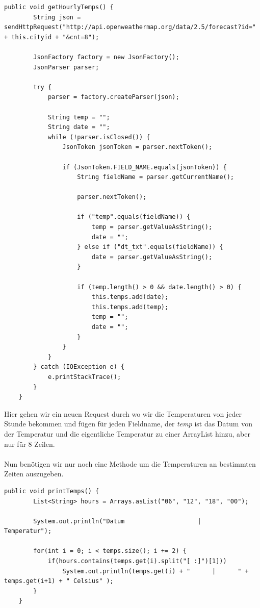 \begin{lstlisting}
public void getHourlyTemps() {
        String json = sendHttpRequest("http://api.openweathermap.org/data/2.5/forecast?id=" + this.cityid + "&cnt=8");

        JsonFactory factory = new JsonFactory();
        JsonParser parser;

        try {
            parser = factory.createParser(json);

            String temp = "";
            String date = "";
            while (!parser.isClosed()) {
                JsonToken jsonToken = parser.nextToken();

                if (JsonToken.FIELD_NAME.equals(jsonToken)) {
                    String fieldName = parser.getCurrentName();

                    parser.nextToken();

                    if ("temp".equals(fieldName)) {
                        temp = parser.getValueAsString();
                        date = "";
                    } else if ("dt_txt".equals(fieldName)) {
                        date = parser.getValueAsString();
                    }

                    if (temp.length() > 0 && date.length() > 0) {
                        this.temps.add(date);
                        this.temps.add(temp);
                        temp = "";
                        date = "";
                    }
                }
            }
        } catch (IOException e) {
            e.printStackTrace();
        }
    }
\end{lstlisting}

Hier gehen wir ein neuen Request durch wo wir die Temperaturen von jeder Stunde bekommen und fügen für jeden Fieldname, der \textit{temp} ist das Datum von der Temperatur und die eigentliche Temperatur zu einer ArrayList hinzu, aber nur für 8 Zeilen. \\\\

Nun benötigen wir nur noch eine Methode um die Temperaturen an bestimmten Zeiten auszugeben.

\begin{lstlisting}
public void printTemps() {
        List<String> hours = Arrays.asList("06", "12", "18", "00");

        System.out.println("Datum                    |      Temperatur");

        for(int i = 0; i < temps.size(); i += 2) {
            if(hours.contains(temps.get(i).split("[ :]")[1]))
                System.out.println(temps.get(i) + "      |      " + temps.get(i+1) + " Celsius" );
        }
    }
\end{lstlisting}

